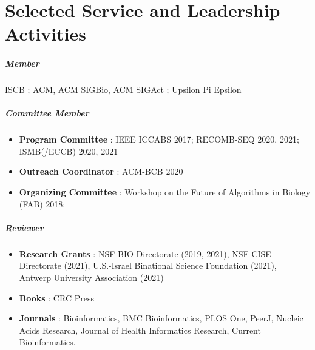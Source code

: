 \documentclass[10pt,letterpaper]{article}
\begin{document}
\section*{Selected Service and Leadership Activities}
\subparagraph{Member} \hspace{1em}
ISCB
; ACM, ACM SIGBio, ACM SIGAct
; Upsilon Pi Epsilon

\subparagraph{Committee Member} 
\begin{itemize}[leftmargin=!,labelindent=5pt,itemindent=-15pt]
    \item \textbf{Program Committee} : IEEE ICCABS 2017; RECOMB-SEQ 2020, 2021; ISMB(/ECCB) 2020, 2021
    \item \textbf{Outreach Coordinator} : ACM-BCB 2020
    \item \textbf{Organizing Committee} : Workshop on the Future of Algorithms in Biology (FAB) 2018; 
\end{itemize}

\subparagraph{Reviewer} 
\begin{itemize}[leftmargin=!,labelindent=5pt,itemindent=-15pt]
    \item \textbf{Research Grants} : 
    	NSF BIO Directorate (2019, 2021), 
    	NSF CISE Directorate (2021), 
	U.S.-Israel Binational Science Foundation (2021), 
	Antwerp University Association (2021)
    \item \textbf{Books} : 
    	CRC Press
    \item \textbf{Journals} :
        Bioinformatics,
        BMC Bioinformatics, 
        PLOS One, 
        PeerJ, 
        Nucleic Acids Research, 
        Journal of Health Informatics Research,
        Current Bioinformatics.
\end{itemize}
\end{document}
